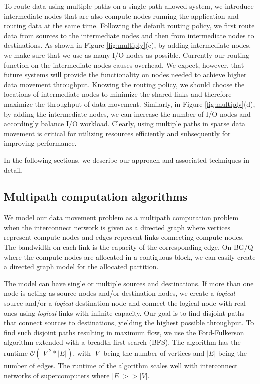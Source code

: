 \documentclass[final,5p,times]{elsarticle}
\begin{document}
To route data using multiple paths on a single-path-allowed system, we introduce intermediate nodes that are also compute nodes running the application and routing data at the same time. Following the default routing policy, we first route data from sources to the intermediate nodes and then from intermediate nodes to destinations. As shown in Figure \ref{fig:multiply}(c), by adding intermediate nodes, we make sure that we use as many I/O nodes as possible. Currently our routing function on the intermediate nodes causes overhead. We expect, however, that future systems will provide the functionality on nodes needed to achieve higher data movement throughput.  Knowing the routing policy, we should choose the locations of intermediate nodes to minimize the shared links and therefore maximize the throughput of data movement. Similarly, in Figure \ref{fig:multiply}(d), by adding the intermediate nodes, we can increase the number of I/O nodes and accordingly balance I/O workload. Clearly, using multiple paths in sparse data movement is critical for utilizing resources efficiently and subsequently for improving performance.

In the following sections, we describe our approach and associated techniques in detail.

\subsection{Multipath computation algorithms}
We model our data movement problem as a multipath computation problem when the interconnect network is given as a directed graph where vertices represent compute nodes and edges represent links connecting compute nodes. The bandwidth on each link is the capacity of the corresponding edge. On BG/Q where the compute nodes are allocated in a contiguous block, we can easily create a directed graph model for the allocated partition.

The model can have single or multiple sources and destinations. If more than one node is acting as source nodes and/or destination nodes, we create a {\em logical} source and/or a {\em logical} destination node and connect the logical node with real ones using {\em logical} links with infinite capacity. Our goal is to find disjoint paths that connect sources to destinations, yielding the highest possible throughput. To find such disjoint paths resulting in maximum flow, we use the Ford-Fulkerson algorithm \cite{ford1987maximal} extended with a breadth-first search (BFS). The algorithm has the runtime $\mathcal{O}(|V|^2*|E|)$, with $|V|$ being the number of vertices and $|E|$ being the number of edges. The runtime of the algorithm scales well with interconnect networks of supercomputers where $|E| >> |V|$.
\end{document}
